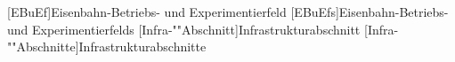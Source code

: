 \begin{acronym}
[EBuEf]{Eisenbahn-Betriebs- und Experimentierfeld}
[EBuEfs]{Eisenbahn-Betriebs- und Experimentierfelds}
[Infra-""Ab\-schnitt]{Infra\-struk\-tur\-ab\-schnitt}
[Infra-""Ab\-schnitte]{Infra\-struk\-tur\-ab\-schnitte}
\end{acronym}
